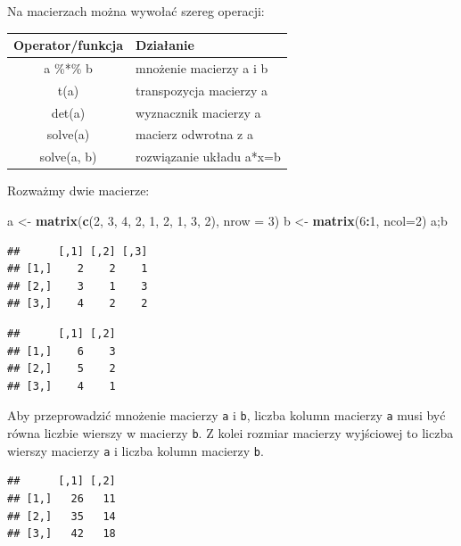 \documentclass[]{book}
\newenvironment{Shaded}{\begin{snugshade}}{\end{snugshade}}
\newcommand{\KeywordTok}[1]{\textcolor[rgb]{0.13,0.29,0.53}{\textbf{#1}}}
\newcommand{\DataTypeTok}[1]{\textcolor[rgb]{0.13,0.29,0.53}{#1}}
\newcommand{\DecValTok}[1]{\textcolor[rgb]{0.00,0.00,0.81}{#1}}
\newcommand{\StringTok}[1]{\textcolor[rgb]{0.31,0.60,0.02}{#1}}
\newcommand{\OperatorTok}[1]{\textcolor[rgb]{0.81,0.36,0.00}{\textbf{#1}}}
\newcommand{\NormalTok}[1]{#1}
\begin{document}
Na macierzach można wywołać szereg operacji:

\begin{longtable}[]{@{}cl@{}}
\toprule
Operator/funkcja & Działanie\tabularnewline
\midrule
\endhead
a \%*\% b & mnożenie macierzy a i b\tabularnewline
t(a) & transpozycja macierzy a\tabularnewline
det(a) & wyznacznik macierzy a\tabularnewline
solve(a) & macierz odwrotna z a\tabularnewline
solve(a, b) & rozwiązanie układu a*x=b\tabularnewline
\bottomrule
\end{longtable}

Rozważmy dwie macierze:

\begin{Shaded}
\begin{Highlighting}[]
\NormalTok{a <-}\StringTok{ }\KeywordTok{matrix}\NormalTok{(}\KeywordTok{c}\NormalTok{(}\DecValTok{2}\NormalTok{, }\DecValTok{3}\NormalTok{, }\DecValTok{4}\NormalTok{, }\DecValTok{2}\NormalTok{, }\DecValTok{1}\NormalTok{, }\DecValTok{2}\NormalTok{, }\DecValTok{1}\NormalTok{, }\DecValTok{3}\NormalTok{, }\DecValTok{2}\NormalTok{), }\DataTypeTok{nrow =} \DecValTok{3}\NormalTok{)}
\NormalTok{b <-}\StringTok{ }\KeywordTok{matrix}\NormalTok{(}\DecValTok{6}\OperatorTok{:}\DecValTok{1}\NormalTok{, }\DataTypeTok{ncol=}\DecValTok{2}\NormalTok{)}
\NormalTok{a;b}
\end{Highlighting}
\end{Shaded}

\begin{verbatim}
##      [,1] [,2] [,3]
## [1,]    2    2    1
## [2,]    3    1    3
## [3,]    4    2    2
\end{verbatim}

\begin{verbatim}
##      [,1] [,2]
## [1,]    6    3
## [2,]    5    2
## [3,]    4    1
\end{verbatim}

Aby przeprowadzić mnożenie macierzy \texttt{a} i \texttt{b}, liczba
kolumn macierzy \texttt{a} musi być równa liczbie wierszy w macierzy
\texttt{b}. Z kolei rozmiar macierzy wyjściowej to liczba wierszy
macierzy \texttt{a} i liczba kolumn macierzy \texttt{b}.

\begin{Shaded}
\end{Shaded}

\begin{verbatim}
##      [,1] [,2]
## [1,]   26   11
## [2,]   35   14
## [3,]   42   18
\end{verbatim}
\end{document}
